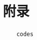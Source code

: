 \newpage



\newpage

\appendix
\renewcommand\thesection{\Alph{section}}

\section{附录}

\begin{lstlisting}
    codes
\end{lstlisting}
